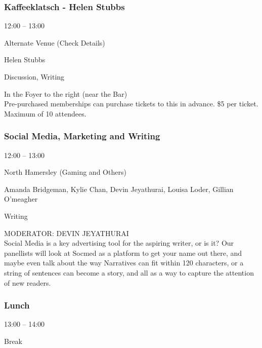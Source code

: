 \documentclass{scrreprt}
\begin{document}
\begin{multicols}{2}
\subsubsection*{Kaffeeklatsch - Helen Stubbs}\begin{description}
\setlength{\itemsep}{0pt}
\setlength{\parsep}{0pt}
\setlength{\parskip}{0pt}
\item[Time:]{12:00 -- 13:00}
\item[Venue:]{Alternate Venue (Check Details)}
\item[People:]{Helen Stubbs}
\item[Tags:]{Discussion, Writing}\end{description}
In the Foyer to the right (near the Bar) \\Pre-purchased memberships can purchase tickets to this in advance. \$5 per ticket. Maximum of 10 attendees.
\subsubsection*{Social Media, Marketing and Writing}\begin{description}
\setlength{\itemsep}{0pt}
\setlength{\parsep}{0pt}
\setlength{\parskip}{0pt}
\item[Time:]{12:00 -- 13:00}
\item[Venue:]{North Hamersley (Gaming and Others)}
\item[People:]{Amanda Bridgeman, Kylie Chan, Devin Jeyathurai, Louisa Loder, Gillian O'meagher}
\item[Tags:]{Writing}\end{description}
MODERATOR: DEVIN JEYATHURAI\\Social Media is a key advertising tool for the aspiring writer, or is it? Our panellists will look at Socmed as a platform to get your name out there, and maybe even talk about the way Narratives can fit within 120 characters, or a string of sentences can become a story, and all as a way to capture the attention of new readers.
\subsubsection*{Lunch}\begin{description}
\setlength{\itemsep}{0pt}
\setlength{\parsep}{0pt}
\setlength{\parskip}{0pt}
\item[Time:]{13:00 -- 14:00}
\item[Tags:]{Break}\end{description}


\end{multicols}
\end{document}
